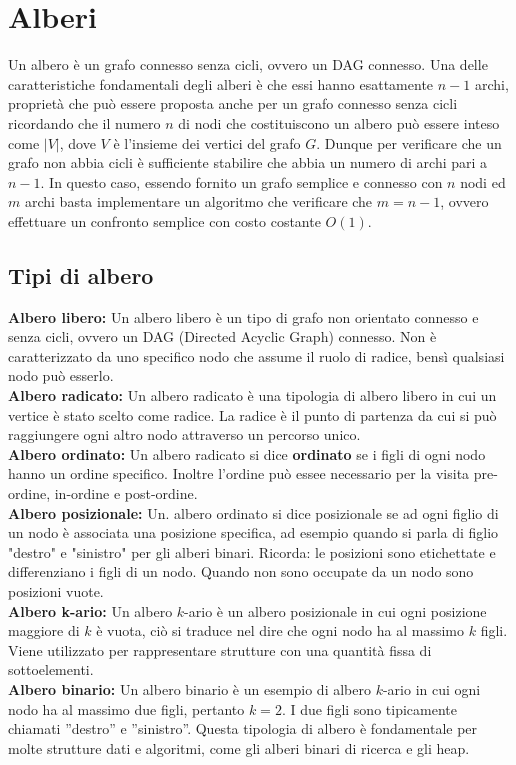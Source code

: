 \chapter{Alberi}
Un albero è un grafo connesso senza cicli, ovvero un DAG connesso. Una delle caratteristiche 
fondamentali degli alberi è che essi hanno esattamente $n-1$ archi, proprietà che può essere
proposta anche per un grafo connesso senza cicli ricordando che il numero $n$ di nodi che costituiscono 
un albero può essere inteso come $|V|$, dove $V$ è l’insieme dei vertici del grafo $G$. Dunque
per verificare che un grafo non abbia cicli è sufficiente stabilire che abbia un numero di archi
pari a $n-1$. In questo caso, essendo fornito un grafo semplice e connesso con $n$ nodi ed $m$ archi
basta implementare un algoritmo che verificare che $m = n-1$, ovvero effettuare un confronto
semplice con costo costante $O(1)$.
\section{Tipi di albero}
\textbf{Albero libero:} Un albero libero è un tipo di grafo non orientato connesso e senza cicli, 
ovvero un DAG (Directed Acyclic Graph) connesso. Non è caratterizzato da uno specifico nodo 
che assume il ruolo di radice, bensì qualsiasi nodo può esserlo.\medskip\\
\textbf{Albero radicato:} Un albero radicato è una tipologia di albero libero in cui un vertice è 
stato scelto come radice. La radice è il punto di partenza da cui si può raggiungere ogni altro nodo attraverso 
un percorso unico.\medskip\\
\textbf{Albero ordinato:} Un albero radicato si dice \textbf{ordinato} se i figli di ogni nodo hanno un ordine specifico. 
Inoltre l'ordine può essee necessario per la visita pre-ordine, in-ordine e post-ordine.\medskip\\
\textbf{Albero posizionale:} Un. albero ordinato si dice posizionale se ad ogni figlio di un nodo è associata 
una posizione specifica, ad esempio quando si parla di figlio "destro" e "sinistro" per gli alberi binari. Ricorda: le posizioni sono 
etichettate e differenziano i figli di un nodo. Quando non sono occupate da un nodo sono posizioni vuote.\medskip\\
\textbf{Albero k-ario:} Un albero $k$-ario è un albero posizionale in cui ogni posizione maggiore di
$k$ è vuota, ciò si traduce nel dire che ogni nodo ha al massimo $k$ figli. Viene utilizzato per
rappresentare strutture con una quantità fissa di sottoelementi.\medskip\\
\textbf{Albero binario:} Un albero binario è un esempio di albero $k$-ario in cui ogni nodo ha al
massimo due figli, pertanto $k = 2$. I due figli sono tipicamente chiamati ”destro” e ”sinistro”.
Questa tipologia di albero è fondamentale per molte strutture dati e algoritmi, come gli alberi
binari di ricerca e gli heap.
